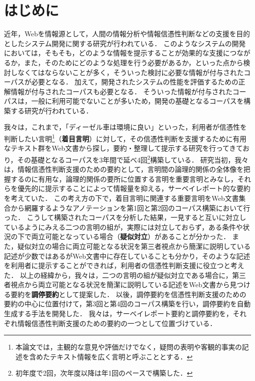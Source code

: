 \documentclass[japanese]{jnlp_1.4}
\begin{document}
\maketitle


\section{はじめに}
\label{sc:introduction}


近年，Webを情報源として，人間の情報分析や情報信憑性判断などの支援を目的としたシステム開発に関する研究が行われている\cite{Akamine2009,Akamine2010,Ennals2010,Finn2001,Kaneko2009,Miyazaki2009,Murakami2010,Shibuki2010,Shibuki2013,Kato2010,Kawai2011,Matsumoto2009,Nakano2011,Fujii2008,Yamamoto2010}．
このようなシステムの開発においては，そもそも，どのような情報を提示することが効果的な支援につながるか，また，そのためにどのような処理を行う必要があるか，といった点から検討しなくてはならないことが多く，そういった検討に必要な情報が付与されたコーパスが必要となる．
加えて，開発されたシステムの性能を評価するための正解情報が付与されたコーパスも必要となる．
そういった情報が付与されたコーパスは，一般に利用可能でないことが多いため，開発の基礎となるコーパスを構築する研究が行われている\cite{Nakano2010,Ptaszynski2012,Radev2000,Wiebe2005,Shibuki2009,Shibuki2011b,Matsuyoshi2010,Nakano2008,Iida2010,Hashimoto2011}．

我々は，これまで，「ディーゼル車は環境に良い」といった，利用者が信憑性を判断したい言明\footnote{本論文では，主観的な意見や評価だけでなく，疑問の表明や客観的事実の記述を含めたテキスト情報を広く言明と呼ぶこととする．}（{\bf 着目言明}）に対して，その信憑性判断を支援するために有用なテキスト群をWeb文書から探し，要約・整理して提示する研究を行ってきており，その基礎となるコーパスを3年間で延べ4回\footnote{初年度で2回，次年度以降は年1回のペースで構築した．}構築している．
研究当初，我々は，情報信憑性判断支援のための要約として，言明間の論理的関係の全体像を把握するのに有用な，論理的関係の要所に位置する言明を重要言明とみなし，それらを優先的に提示することによって情報量を抑える，サーベイレポート的な要約を考えて{いた．}
この考え方の下で，着目言明に関連する重要言明をWeb文書集合から網羅するようなアノテーションを第1回と第2回のコーパス構築において行った．
こうして構築されたコーパスを分析した結果，一見すると互いに対立しているようにみえる二つの言明の組が，実際には対立しておらず，ある条件や状況の下で両立可能となっている場合（{\bf 疑似対立}）があることが分かった．
また，疑似対立の場合に両立可能となる状況を第三者視点から簡潔に説明している記述が少数ではあるがWeb文書中に存在していることも分かり，そのような記述を利用者に提示することができれば，利用者の信憑性判断支援に役立つと考えた．
以上の経緯から，我々は，二つの言明の組が疑似対立である場合に，第三者視点から両立可能となる状況を簡潔に説明している記述をWeb文書から見つける要約を{\bf 調停要約}として提案した．
以後，調停要約を信憑性判断支援のための要約の中心に位置付けて，第3回と第4回のコーパス構築を行い，調停要約を自動生成する手法を開発した．
{我々は}，サーベイレポート要約と調停要約を，それぞれ情報信憑性判断支援のための要約の一つとして位置づけている．
\end{document}
